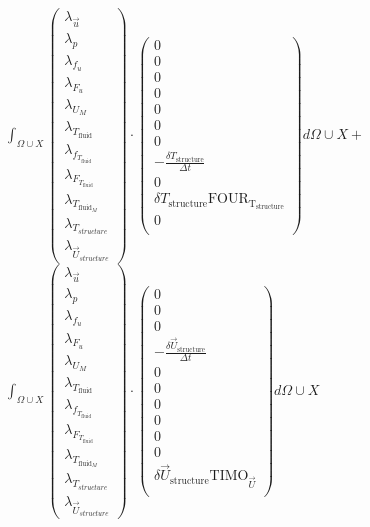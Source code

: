 \documentclass[10pt]{article} %
\begin{document}
\begin{center}
		$\int_{\Omega \cup X}
	\begin{pmatrix}
		\lambda_{\vec{u}} \\ \lambda_p \\ \lambda_{f_u} \\ \lambda_{F_u} \\ \lambda_{U_M}\\ \lambda_{T_{\text{fluid}}} \\ \lambda_{f_{T_{\text{fluid}}}} \\ \lambda_{F_{T_{\text{fluid}}}} \\ \lambda_{T_{\text{fluid}_M}} \\ \lambda_{T_{structure}} \\ \lambda_{\vec{U}_{structure}}
	\end{pmatrix}
	\cdot
	\begin{pmatrix}
		0\\
		0\\
		0\\
		0\\
		0\\
		0\\
		0\\
		-\frac{\delta T_{\text{structure}}}{\Delta t}\\
		0\\
		\delta T_{\text{structure}} \text{FOUR}_{\text{T}_{\text{structure}}}\\
		0\\
	\end{pmatrix}
	d\Omega \cup X + $\\
	
	$\int_{\Omega \cup X}
	\begin{pmatrix}
		\lambda_{\vec{u}} \\ \lambda_p \\ \lambda_{f_u} \\ \lambda_{F_u} \\ \lambda_{U_M}\\ \lambda_{T_{\text{fluid}}} \\ \lambda_{f_{T_{\text{fluid}}}} \\ \lambda_{F_{T_{\text{fluid}}}} \\ \lambda_{T_{\text{fluid}_M}} \\ \lambda_{T_{structure}} \\ \lambda_{\vec{U}_{structure}}
	\end{pmatrix}
	\cdot
	\begin{pmatrix}
		0 \\
		0 \\
		0 \\
		-\frac{\delta \vec{U}_{\text{structure}}}{\Delta t}\\
		0 \\
		0 \\
		0 \\
		0 \\
		0 \\
		0 \\
		\delta \vec{U}_{\text{structure}} \text{TIMO}_{\vec{U}}\\
	\end{pmatrix}
	d\Omega \cup X $\\
	

\end{center}
\end{document}

